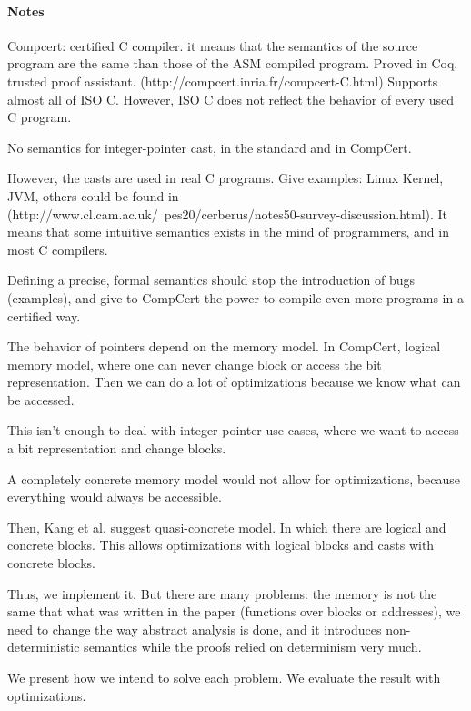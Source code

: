 \paragraph{Notes}

Compcert: certified C compiler. it means that the semantics of the source program are the same than those of the ASM compiled program. Proved in Coq, trusted proof assistant. (http://compcert.inria.fr/compcert-C.html)
Supports almost all of ISO C. However, ISO C does not reflect the behavior of every used C program.

No semantics for integer-pointer cast, in the standard and in CompCert.

However, the casts are used in real C programs. Give examples: Linux Kernel, JVM, others could be found in (http://www.cl.cam.ac.uk/~pes20/cerberus/notes50-survey-discussion.html).
It means that some intuitive semantics exists in the mind of programmers, and in most C compilers.

Defining a precise, formal semantics should stop the introduction of bugs (examples), and give to CompCert the power to compile even more programs in a certified way.

The behavior of pointers depend on the memory model.
In CompCert, logical memory model, where one can never change block or access the bit representation.
Then we can do a lot of optimizations because we know what can be accessed.

This isn't enough to deal with integer-pointer use cases, where we want to access a bit representation and change blocks.

A completely concrete memory model would not allow for optimizations, because everything would always be accessible.

Then, Kang et al. suggest quasi-concrete model. In which there are logical and concrete blocks. This allows optimizations with logical blocks and casts with concrete blocks.

Thus, we implement it.
But there are many problems: the memory is not the same that what was written in the paper (functions over blocks or addresses),
we need to change the way abstract analysis is done, and it introduces non-deterministic semantics while the proofs relied on determinism very much.

We present how we intend to solve each problem. We evaluate the result with optimizations.
